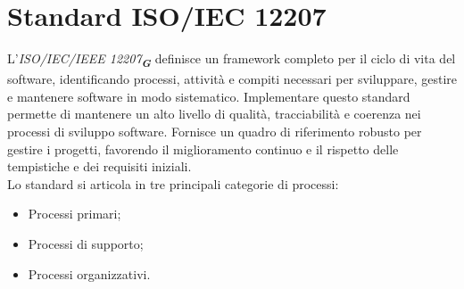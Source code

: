 

\appendix %


\section{Standard ISO/IEC 12207}
\label{sec:standard_iso-iec_12207}

L'\emph{ISO/IEC/IEEE 12207}\textsubscript{\textit{\textbf{G}}} definisce un framework completo per il ciclo di vita del software, identificando processi, attività e compiti necessari per sviluppare, gestire e mantenere software in modo sistematico. Implementare questo standard permette di mantenere un alto livello di qualità, tracciabilità e coerenza nei processi di sviluppo software. Fornisce un quadro di riferimento robusto per gestire i progetti, favorendo il miglioramento continuo e il rispetto delle tempistiche e dei requisiti iniziali.\\
Lo standard si articola in tre principali categorie di processi:
\begin{itemize}
    \item Processi primari;
    \item Processi di supporto;
    \item Processi organizzativi.
\end{itemize}

